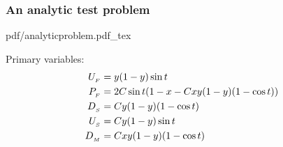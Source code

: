 \begin{frame}
  \frametitle{An analytic test problem}

  \vspace{1cm}
  \def\svgwidth{1.1\textwidth}
  {pdf/analyticproblem.pdf_tex}
  
  Primary variables:
  \begin{displaymath}
    \begin{split}
       U_{_{F}} &= y(1 - y)\sin{t} \\
       P_{_{F}} &= 2C\sin{t}(1 - x -Cxy(1 -y)(1 -\cos{t})) \\
       D_{_{S}} &= Cy(1 - y)(1 - \cos{t})  \\
       U_{_{S}} &= Cy(1 - y)\sin{t} \\
       D_{_{M}} &= Cxy(1 -y)(1 -\cos{t}) \\
    \end{split}
  \end{displaymath}
%   

\end{frame}
